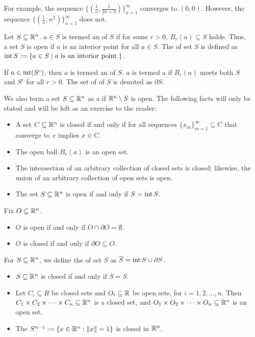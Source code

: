 For example, the sequence $\{(\frac{1}{n},\frac{1}{2n+3})\}_{n=1}^{\infty}$ converges to $(0,0)$. However, the sequence $\{(\frac{1}{n},n^{2})\}_{n=1}^{\infty}$ does not.

\begin{definition}
    Let $S \subseteq \mathbb{R}^{n}$. $a \in S$ is termed an  of $S$ if for some $r > 0$, $B_{r}(a) \subseteq S$ holds. Thus, a set $S$ is open if $a$ is an interior point for all $a \in S$. The  of set $S$ is defined as $\operatorname{int} S \vcentcolon= \{a \in S \mid a \text{ is an interior point.}\}$.

    If $a \in \operatorname{int}(S^{c})$, then $a$ is termed an  of $S$. $a$ is termed a  if $B_{r}(a)$ meets both $S$ and $S^{c}$ for all $r > 0$. The set of  of $S$ is denoted as $\partial S$.
\end{definition}

We also term a set $S \subseteq \mathbb{R}^{n}$ as a  if $\mathbb{R}^{n} \setminus S$ is open. The following facts will only be stated and will be left as an exercise to the reader:
\begin{itemize}
    \item A set $C \subseteq \mathbb{R}^{n}$ is closed if and only if for all sequences $\{x_{m}\}_{m=1}^{\infty} \subseteq C$ that converge to $x$ implies $x \in C$.
    \item The open ball $B_{r}(a)$ is an open set.
    \item The intersection of an arbitrary collection of closed sets is closed; likewise, the union of an arbitrary collection of open sets is open.
    \item The set $S \subseteq \mathbb{R}^{n}$ is open if and only if $S = \operatorname{int} S$.
\end{itemize}
Fix $O \subseteq \mathbb{R}^{n}$.
\begin{itemize}
    \item $O$ is open if and only if $O \cap \partial O = \emptyset$.
    \item $O$ is closed if and only if $\partial O \subseteq O$.
\end{itemize}
For $S \subseteq \mathbb{R}^{n}$, we define the  of set $S$ as $\overline{S} = \operatorname{int} S \cup \partial S$.
\begin{itemize}
    \item $S \subseteq \mathbb{R}^{n}$ is closed if and only if $\overline{S} = S$.
    \item Let $C_{i} \subseteq R$ be closed sets and $O_{i} \subseteq \mathbb{R}$ be open sets, for $i = 1,2,\ldots,n$. Then $C_{1} \times C_{2} \times \cdots \times C_{n} \subseteq \mathbb{R}^{n}$ is a closed set, and $O_{1} \times O_{2} \times \cdots \times O_{n} \subseteq \mathbb{R}^{n}$ is an open set.
    \item The  $S^{n-1} \vcentcolon= \{x \in \mathbb{R}^{n} : \left\lVert x\right\rVert = 1\}$ is closed in $\mathbb{R}^{n}$.
\end{itemize}

